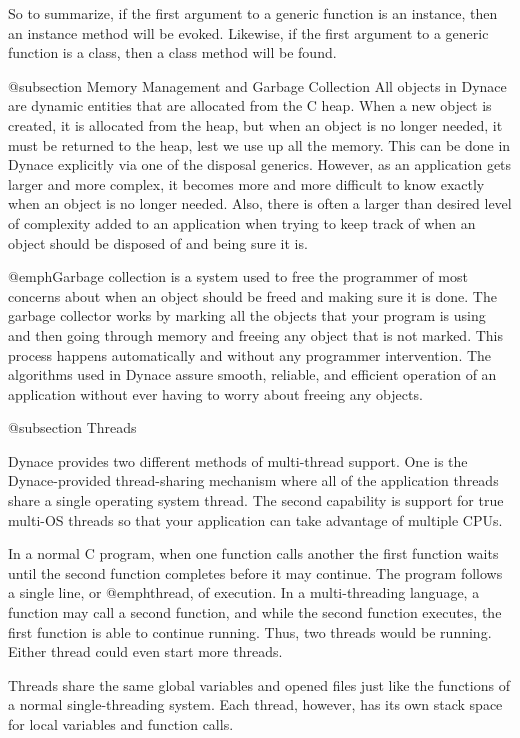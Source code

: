 So to summarize, if the first argument to a generic function is an
instance, then an instance method will be evoked.  Likewise, if the
first argument to a generic function is a class, then a class method
will be found.

@subsection Memory Management and Garbage Collection
All objects in Dynace are dynamic entities that are allocated from the C
heap.  When a new object is created, it is allocated from the heap, but
when an object is no longer needed, it must be returned to the heap,
lest we use up all the memory.  This can be done in Dynace explicitly via
one of the disposal generics.  However, as an application gets larger
and more complex, it becomes more and more difficult to know exactly
when an object is no longer needed.  Also, there is often a larger than
desired level of complexity added to an application when trying to keep
track of when an object should be disposed of and being sure it is.

@emph{Garbage collection} is a system used to free the programmer of
most concerns about when an object should be freed and making sure it
is done.  The garbage collector works by marking all the objects that
your program is using and then going through memory and freeing any
object that is not marked.  This process happens automatically and
without any programmer intervention.  The algorithms used in Dynace assure
smooth, reliable, and efficient operation of an application without
ever having to worry about freeing any objects.

@subsection Threads

Dynace provides two different methods of multi-thread support.  One is
the Dynace-provided thread-sharing mechanism where all of the
application threads share a single operating system thread.  The
second capability is support for true multi-OS threads so that your
application can take advantage of multiple CPUs.

In a normal C program, when one function calls another the first function
waits until the second function completes before it may continue.  The
program follows a single line, or @emph{thread}, of execution.  In a
multi-threading language, a function may call a second function, and
while the second function executes, the first function is able to continue
running.  Thus, two threads would be running.  Either thread could even
start more threads.

Threads share the same global variables and opened files just like the
functions of a normal single-threading system.  Each thread, however,
has its own stack space for local variables and function calls.

